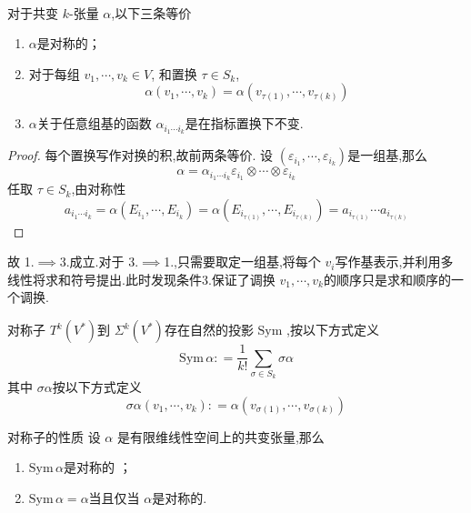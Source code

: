 \documentclass[../../几何与拓扑.tex]{subfiles}
\begin{document}
\begin{remark}
    \\对于共变 $ k $-张量 $ \alpha $,以下三条等价 
    \begin{enumerate}
        \item $ \alpha $是对称的；
        \item 对于每组 $ v_1,\cdots ,v_{k}  \in V$, 和置换 $ \tau \in S_{k} $, $$
        \alpha\left( v_1,\cdots ,v_{k} \right)= \alpha\left( v_{\tau\left( 1 \right) },\cdots ,v_{\tau\left( k \right) }   \right)  
        $$ 
        \item $ \alpha $关于任意组基的函数 $ \alpha_{i_1\cdots i_{k}} $是在指标置换下不变.  
    \end{enumerate}
    \begin{proof}
        每个置换写作对换的积,故前两条等价.
           设 $ \left( \varepsilon_{i_1   },\cdots ,\varepsilon_{i_{k}} \right)  $是一组基,那么 $$
           \alpha = \alpha_{i_1\cdots i_{k}} \varepsilon_{i_1} \otimes \cdots \otimes \varepsilon_{i_{k}}
           $$ 任取 $ \tau \in S_{k} $,由对称性 $$
           a_{i_1\cdots i_{k}}=\alpha\left( E_{i_1},\cdots, E_{i_{k}} \right) = \alpha\left(  E_{i_{\tau\left( 1 \right) }},\cdots ,E_{i_{\tau\left( k \right) }} \right) =a_{i_{\tau\left( 1 \right) }}\cdots a_{i_{\tau\left( k \right) }}
           $$ 
    \end{proof}故 1.$ \implies $3.成立.对于 3.$ \implies $1.,只需要取定一组基,将每个 $ v_{i} $写作基表示,并利用多线性将求和符号提出.此时发现条件3.保证了调换 $ v_1,\cdots ,v_{k} $的顺序只是求和顺序的一个调换.  
\end{remark}

\begin{definition}{对称子}
    $ T^{k}\left( V^{*} \right)  $到 $ \Sigma^{k}\left( V^{*} \right)  $存在自然的投影 $ \mathrm{Sym} $ ,按以下方式定义 $$
    \mathrm{Sym}\,\alpha : = \frac{1}{k!} \sum_{\sigma \in S_{k}} \sigma \alpha
    $$其中 $ \sigma \alpha $按以下方式定义 $$
    \sigma \alpha\left( v_1,\cdots ,v_{k} \right): = \alpha\left( v_{\sigma\left( 1 \right) },\cdots ,v_{\sigma\left( k \right) } \right)  
    $$
\end{definition}
\begin{proposition}{对称子的性质}
    设 $ \alpha $ 是有限维线性空间上的共变张量,那么
    \begin{enumerate}
        \item $ \mathrm{Sym}\,\alpha $是对称的 ；
        \item $ \mathrm{Sym}\,\alpha=\alpha $当且仅当 $ \alpha $是对称的.  
    \end{enumerate}
    
\end{proposition}
\end{document}
